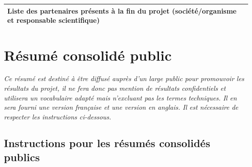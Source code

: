\documentclass[a4paper,11pt]{article}
\newcommand{\instructions}[1]{%
		{%
			\setlength{\parindent}{0cm}%
			{\em\color{ANRvert}#1}%
		}%
	}
\newcommand{\instructions}[1]{}
\begin{document}
\bigskip


\bigskip

\noindent\begin{tabular}{| p{} | p{} |}
	\hline
	Liste des partenaires présents à la
fin du projet (société/organisme et
responsable scientifique) &  \\
	\hline
\end{tabular}

\bigskip




\section{Résumé consolidé public}

\instructions{Ce résumé est destiné à être diffusé auprès d'un large public pour promouvoir les résultats du projet, il ne fera donc pas mention de résultats confidentiels et utilisera un vocabulaire adapté mais n'excluant pas les termes techniques. Il en sera fourni une version française et une version en anglais. Il est nécessaire de respecter les instructions ci-dessous.}

\ifdefined\VersionWithInstructions
\subsection{Instructions pour les résumés consolidés publics}
\fi
\end{document}
